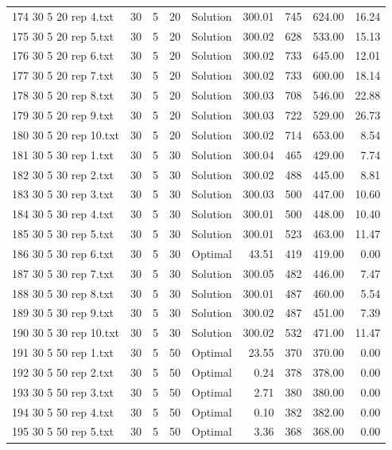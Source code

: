 \begin{longtable}{lrrllrrrr}
174 30 5 20 rep 4.txt & 30 & 5 & 20 & Solution & 300.01 & 745 & 624.00 & 16.24\\
175 30 5 20 rep 5.txt & 30 & 5 & 20 & Solution & 300.02 & 628 & 533.00 & 15.13\\
176 30 5 20 rep 6.txt & 30 & 5 & 20 & Solution & 300.02 & 733 & 645.00 & 12.01\\
177 30 5 20 rep 7.txt & 30 & 5 & 20 & Solution & 300.02 & 733 & 600.00 & 18.14\\
178 30 5 20 rep 8.txt & 30 & 5 & 20 & Solution & 300.03 & 708 & 546.00 & 22.88\\
179 30 5 20 rep 9.txt & 30 & 5 & 20 & Solution & 300.03 & 722 & 529.00 & 26.73\\
180 30 5 20 rep 10.txt & 30 & 5 & 20 & Solution & 300.02 & 714 & 653.00 &  8.54\\
181 30 5 30 rep 1.txt & 30 & 5 & 30 & Solution & 300.04 & 465 & 429.00 &  7.74\\
182 30 5 30 rep 2.txt & 30 & 5 & 30 & Solution & 300.02 & 488 & 445.00 &  8.81\\
183 30 5 30 rep 3.txt & 30 & 5 & 30 & Solution & 300.03 & 500 & 447.00 & 10.60\\
184 30 5 30 rep 4.txt & 30 & 5 & 30 & Solution & 300.01 & 500 & 448.00 & 10.40\\
185 30 5 30 rep 5.txt & 30 & 5 & 30 & Solution & 300.01 & 523 & 463.00 & 11.47\\
186 30 5 30 rep 6.txt & 30 & 5 & 30 & Optimal & 43.51 & 419 & 419.00 &  0.00\\
187 30 5 30 rep 7.txt & 30 & 5 & 30 & Solution & 300.05 & 482 & 446.00 &  7.47\\
188 30 5 30 rep 8.txt & 30 & 5 & 30 & Solution & 300.01 & 487 & 460.00 &  5.54\\
189 30 5 30 rep 9.txt & 30 & 5 & 30 & Solution & 300.02 & 487 & 451.00 &  7.39\\
190 30 5 30 rep 10.txt & 30 & 5 & 30 & Solution & 300.02 & 532 & 471.00 & 11.47\\
191 30 5 50 rep 1.txt & 30 & 5 & 50 & Optimal & 23.55 & 370 & 370.00 &  0.00\\
192 30 5 50 rep 2.txt & 30 & 5 & 50 & Optimal &  0.24 & 378 & 378.00 &  0.00\\
193 30 5 50 rep 3.txt & 30 & 5 & 50 & Optimal &  2.71 & 380 & 380.00 &  0.00\\
194 30 5 50 rep 4.txt & 30 & 5 & 50 & Optimal &  0.10 & 382 & 382.00 &  0.00\\
195 30 5 50 rep 5.txt & 30 & 5 & 50 & Optimal &  3.36 & 368 & 368.00 &  0.00\\

\end{longtable}
